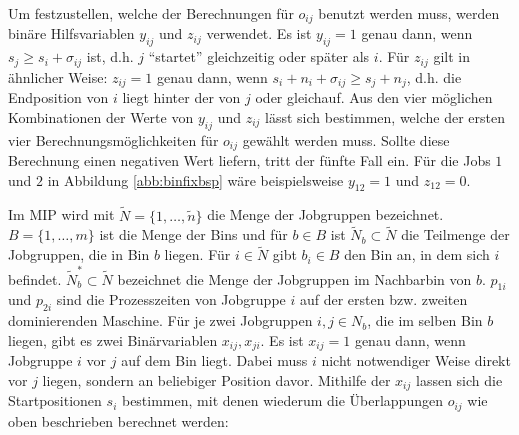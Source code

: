 \documentclass{scrreprt}
\begin{document}
Um festzustellen, welche der Berechnungen für $o_{ij}$ benutzt werden muss, werden binäre Hilfsvariablen $y_{ij}$ und $z_{ij}$ verwendet.
Es ist $y_{ij}=1$ genau dann, wenn $s_j \geq s_i + \sigma_{ij}$ ist, d.h. $j$ "`startet"' gleichzeitig oder später als $i$.
Für $z_{ij}$ gilt in ähnlicher Weise: $z_{ij}=1$ genau dann, wenn $s_i + n_i + \sigma_{ij} \geq s_j + n_j$, 
d.h. die Endposition von $i$ liegt hinter der von $j$ oder gleichauf.
Aus den vier möglichen Kombinationen der Werte von $y_{ij}$ und $z_{ij}$ lässt sich bestimmen, 
welche der ersten vier Berechnungsmöglichkeiten für $o_{ij}$ gewählt werden muss.
Sollte diese Berechnung einen negativen Wert liefern, tritt der fünfte Fall ein.
Für die Jobs $1$ und $2$ in Abbildung \ref{abb:binfixbsp} wäre beispielsweise $y_{12}=1$ und $z_{12}=0$.

Im MIP wird mit $\tilde{N}=\{1,\ldots,\tilde{n}\}$ die Menge der Jobgruppen bezeichnet.
$B=\{1,\ldots,m\}$ ist die Menge der Bins und für $b\in B$ ist $\tilde{N}_b\subset \tilde{N}$ die Teilmenge der Jobgruppen, die in Bin $b$ liegen.
Für $i\in\tilde{N}$ gibt $b_i\in B$ den Bin an, in dem sich $i$ befindet.
$\tilde{N}_b^*\subset \tilde{N}$ bezeichnet die Menge der Jobgruppen im Nachbarbin von $b$.
$p_{1i}$ und $p_{2i}$ sind die Prozesszeiten von Jobgruppe $i$ auf der ersten bzw. zweiten dominierenden Maschine.
Für je zwei Jobgruppen $i,j\in N_b$, die im selben Bin $b$ liegen, gibt es
zwei Binärvariablen $x_{ij},x_{ji}$. Es ist $x_{ij}=1$ genau dann, wenn 
Jobgruppe $i$ vor $j$ auf dem Bin liegt. Dabei muss $i$ nicht notwendiger
Weise direkt vor $j$ liegen, sondern an beliebiger Position davor.
Mithilfe der $x_{ij}$ lassen sich die Startpositionen $s_i$ bestimmen, mit denen wiederum die Überlappungen $o_{ij}$ wie oben beschrieben berechnet werden:
\end{document}

